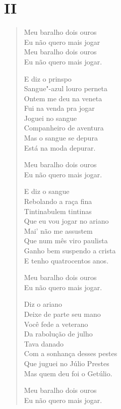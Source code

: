 \pagebreak
\section*{II}

\begin{verse}
\quad\quad\quad{}Meu baralho dois ouros\\
\quad\quad\quad{}Eu não quero mais jogar\\
\quad\quad\quad{}Meu baralho dois ouros\\
\quad\quad\quad{}Eu não quero mais jogar.

E diz o prinspo\\
Sangue"-azul louro perneta\\
Ontem me deu na veneta\\
Fui na venda pra jogar\\
Joguei no sangue\\
Companheiro de aventura\\
Mas o sangue se depura\\
Está na moda depurar.

\quad\quad\quad{}Meu baralho dois ouros\\
\quad\quad\quad{}Eu não quero mais jogar.

E diz o sangue\\
Rebolando a raça fina\\
Tintinabulem tintinas\\
Que eu vou jogar no ariano\\
Mai' não me assustem\\
Que num mês viro paulista\\
Ganho bem suspendo a crista\\
E tenho quatrocentos anos.

\quad\quad\quad{}Meu baralho dois ouros\\
\quad\quad\quad{}Eu não quero mais jogar.

Diz o ariano\\
Deixe de parte seu mano\\
Você fede a veterano\\
Da rabolução de julho\\
Tava danado\\
Com a sonhança desses pestes\\
Que juguei no Júlio Prestes\\
Mas quem deu foi o Getúlio.

\quad\quad\quad{}Meu baralho dois ouros\\
\quad\quad\quad{}Eu não quero mais jogar.


\end{verse}
